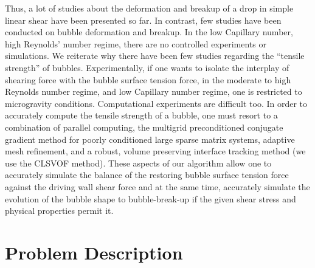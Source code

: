 \documentclass{elsarticle}
\begin{document}
{ Thus, a lot of studies about the deformation and breakup of a drop in simple linear shear have been presented so far. In contrast, few studies have been conducted on bubble deformation and breakup.  In the low Capillary number, high Reynolds' number regime, there are no controlled experiments or simulations.  We reiterate why there have been few studies regarding the ``tensile strength'' of bubbles. Experimentally, if one wants to isolate the interplay of shearing force with the bubble surface tension force, in the moderate to high Reynolds number regime, and low Capillary number regime, one is restricted to microgravity conditions.  Computational experiments are difficult too. In order to accurately compute the tensile strength of a bubble, one must resort to a combination of parallel computing, the multigrid preconditioned conjugate gradient method\cite{tatebe1993multigrid,SusSmiHusOhtZhi07} for poorly conditioned large sparse matrix systems, adaptive mesh refinement\cite{AMReX_JOSS,SusSmiHusOhtZhi07}, and a robust, volume preserving interface tracking method (we use the CLSVOF method\cite{SusPuc00,SusSmiHusOhtZhi07}).  These aspects of our algorithm allow one to accurately simulate the balance of the restoring bubble surface tension force against the driving wall shear force and at the same time, accurately simulate the evolution of the bubble shape to bubble-break-up if the given shear stress and physical properties permit it.
}
\section{Problem Description}
\end{document}
